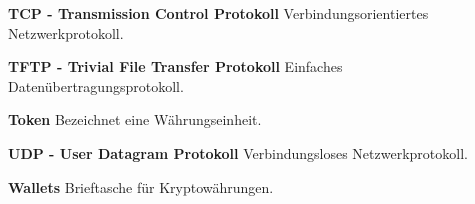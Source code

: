 \textbf{TCP - Transmission Control Protokoll}\newline
Verbindungsorientiertes Netzwerkprotokoll.

\textbf{TFTP - Trivial File Transfer Protokoll}\newline
Einfaches Datenübertragungsprotokoll.

\textbf{Token}\newline
Bezeichnet eine Währungseinheit.

\textbf{UDP - User Datagram Protokoll}\newline
Verbindungsloses Netzwerkprotokoll.

\textbf{Wallets}\newline
Brieftasche für Kryptowährungen.



